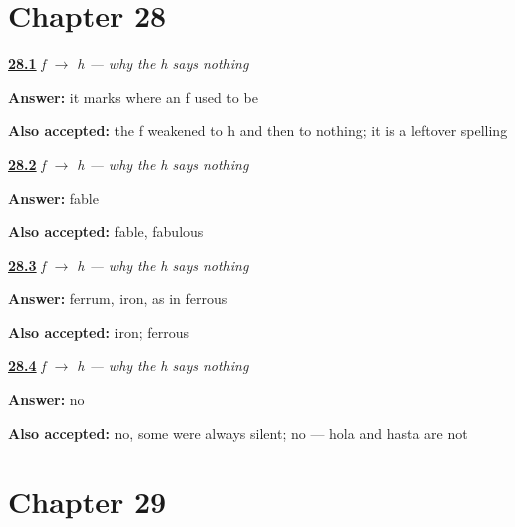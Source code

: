 \section*{Chapter 28}

\noindent\begin{minipage}[t]{\linewidth}
\raggedright
\hyperlink{review-ES-C57-f-a-h-why}{\textbf{28.1}} \emph{f $\to$ h — why the h says nothing}\par
\small \textbf{Answer:} it marks where an f used to be\par
\footnotesize \textbf{Also accepted:} the f weakened to h and then to nothing; it is a leftover spelling
\end{minipage}\par\medskip

\noindent\begin{minipage}[t]{\linewidth}
\raggedright
\hyperlink{review-ES-C57-f-a-h-hablar}{\textbf{28.2}} \emph{f $\to$ h — why the h says nothing}\par
\small \textbf{Answer:} fable\par
\footnotesize \textbf{Also accepted:} fable, fabulous
\end{minipage}\par\medskip

\noindent\begin{minipage}[t]{\linewidth}
\raggedright
\hyperlink{review-ES-C57-f-a-h-decode}{\textbf{28.3}} \emph{f $\to$ h — why the h says nothing}\par
\small \textbf{Answer:} ferrum, iron, as in ferrous\par
\footnotesize \textbf{Also accepted:} iron; ferrous
\end{minipage}\par\medskip

\noindent\begin{minipage}[t]{\linewidth}
\raggedright
\hyperlink{review-ES-C57-f-a-h-limit}{\textbf{28.4}} \emph{f $\to$ h — why the h says nothing}\par
\small \textbf{Answer:} no\par
\footnotesize \textbf{Also accepted:} no, some were always silent; no — hola and hasta are not
\end{minipage}\par\medskip

\section*{Chapter 29}

